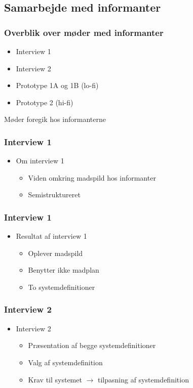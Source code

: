 \subsection{Samarbejde med informanter}

\begin{frame}
\frametitle{Overblik over møder med informanter}
	\begin{itemize}	
		\item Interview 1
		\item Interview 2
		\item Prototype 1A og 1B (lo-fi)
		\item Prototype 2 (hi-fi)
	\end{itemize}
		Møder foregik hos informanterne
\end{frame}

\begin{frame}
\frametitle{Interview 1}
	\begin{itemize}
	\item Om interview 1
			\begin{itemize}
			\item Viden omkring madspild hos informanter
			\item Semistruktureret
			\end{itemize}
	\end{itemize}
\end{frame}

\begin{frame}
\frametitle{Interview 1}
	\begin{itemize}
	\item Resultat af interview 1
			\begin{itemize}
				\item Oplever madspild
				\item Benytter ikke madplan
				\item To systemdefinitioner
			\end{itemize}	
	\end{itemize}
\end{frame}

\begin{frame}
\frametitle{Interview 2}
	\begin{itemize}
	\item Interview 2
			\begin{itemize}
			\item Præsentation af begge systemdefinitioner
			\item Valg af systemdefinition
			\item Krav til systemet $\rightarrow$ tilpasning af systemdefinition
			\end{itemize}
	\end{itemize}
\end{frame}

